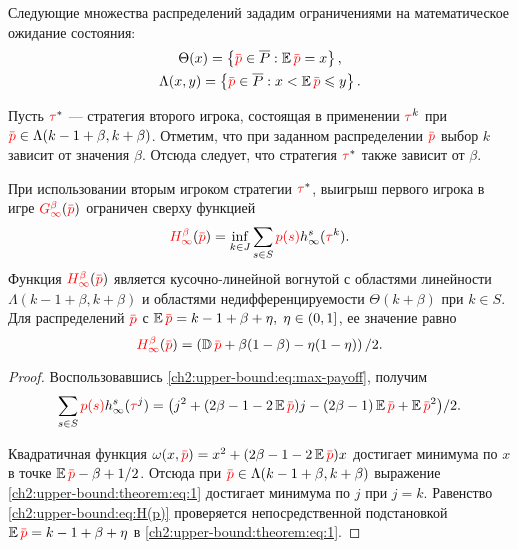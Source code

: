 {Следующие множества распределений зададим ограничениями на математическое ожидание состояния:
\begin{gather*}
  \Theta(x) = \left\{ \pd \in \PM: \E \pd = x \right\}, \\
  \Lambda(x, y) = \left\{ \pd \in \PM: x < \E \pd \leqslant y \right\}.
\end{gather*}

Пусть $\textcolor{red}{\tau}^*$ --- стратегия второго игрока, состоящая в применении $\textcolor{red}{\tau}^k$ при $\pd \in \Lambda(k-1+\beta,k+\beta)$.
Отметим, что при заданном распределении $\pd$ выбор $k$ зависит от значения $\beta$.
Отсюда следует, что стратегия $\textcolor{red}{\tau}^*$ также зависит от $\beta$.

\begin{theorem}
  \label{ch2:upper-bound:theorem}
  При использовании вторым игроком стратегии $\textcolor{red}{\tau}^*$, выигрыш первого игрока в игре
  $\theG{\infty}(\pd)$ ограничен сверху функцией
  \begin{equation*}
    \H{\infty}(\pd) = \inf_{k \in J} \sum_{s \in S} \pc{s}  h^s_\infty(\taur^k).
  \end{equation*}
  Функция $\H{\infty}(\pd)$ является кусочно-линейной вогнутой с областями линейности $\Lambda(k - 1 + \beta, k + \beta)$ и областями недифференцируемости $\Theta(k+\beta)$ при $k \in S$.
  Для распределений $\pd$ с $\E \pd = k - 1 + \beta + \eta, \; \eta \in (0, 1]$, ее значение равно
  \begin{equation}
    \label{ch2:upper-bound:eq:H(p)}
    \H{\infty}(\pd) = \left( \D \pd + \beta(1-\beta) - \eta(1-\eta) \right)/2.
  \end{equation}
\end{theorem}
\begin{proof}
  Воспользовавшись \eqref{ch2:upper-bound:eq:max-payoff}, получим
  \begin{equation}
    \label{ch2:upper-bound:theorem:eq:1}
    \begin{gathered}
    \sum_{s \in S} \pc{s} h^s_\infty(\taur^j) = \bigl(
      j^2 + (2\beta - 1 - 2 \E \pd)j - (2\beta - 1) \E \pd + \E \pd^2 
    \bigr)/2.
    \end{gathered}
  \end{equation}
  
  Квадратичная функция $\omega(x, \pd) = x^2 + (2\beta - 1 - 2\E \pd)x$ достигает минимума по $x$ в точке
  $\E \pd - \beta + 1/2$.
  Отсюда при $\pd \in \Lambda(k - 1 + \beta, k + \beta)$ выражение \eqref{ch2:upper-bound:theorem:eq:1} достигает минимума по $j$ при $j = k$.
  Равенство \eqref{ch2:upper-bound:eq:H(p)} проверяется непосредственной подстановкой $\E \pd = k - 1 + \beta + \eta$ в \eqref{ch2:upper-bound:theorem:eq:1}.
\end{proof}

}
